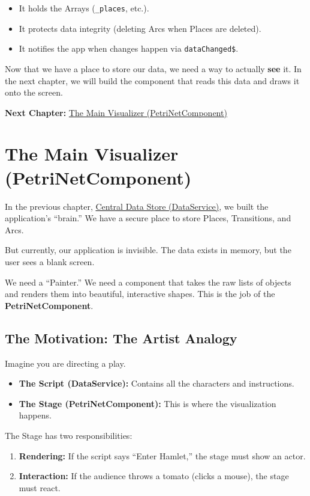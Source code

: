 \documentclass[a4paper,11pt,oneside]{report}
\begin{document}
\begin{itemize}
    \item It holds the Arrays (\texttt{\_places}, etc.).
    \item It protects data integrity (deleting Arcs when Places are deleted).
    \item It notifies the app when changes happen via \texttt{dataChanged\$}.
\end{itemize}

Now that we have a place to store our data, we need a way to actually \textbf{see} it. In the next chapter, we will build the component that reads this data and draws it onto the screen.

\textbf{Next Chapter:} \hyperref[chap:visualizer]{The Main Visualizer (PetriNetComponent)}

\chapter{The Main Visualizer (PetriNetComponent)}
\label{chap:visualizer}

In the previous chapter, \hyperref[chap:dataservice]{Central Data Store (DataService)}, we built the application's ``brain.'' We have a secure place to store Places, Transitions, and Arcs.

But currently, our application is invisible. The data exists in memory, but the user sees a blank screen.

We need a ``Painter.'' We need a component that takes the raw lists of objects and renders them into beautiful, interactive shapes. This is the job of the \textbf{PetriNetComponent}.

\section{The Motivation: The Artist Analogy}

Imagine you are directing a play.
\begin{itemize}
    \item \textbf{The Script (DataService):} Contains all the characters and instructions.
    \item \textbf{The Stage (PetriNetComponent):} This is where the visualization happens.
\end{itemize}

The Stage has two responsibilities:
\begin{enumerate}
    \item \textbf{Rendering:} If the script says ``Enter Hamlet,'' the stage must show an actor.
    \item \textbf{Interaction:} If the audience throws a tomato (clicks a mouse), the stage must react.
\end{enumerate}
\end{document}
